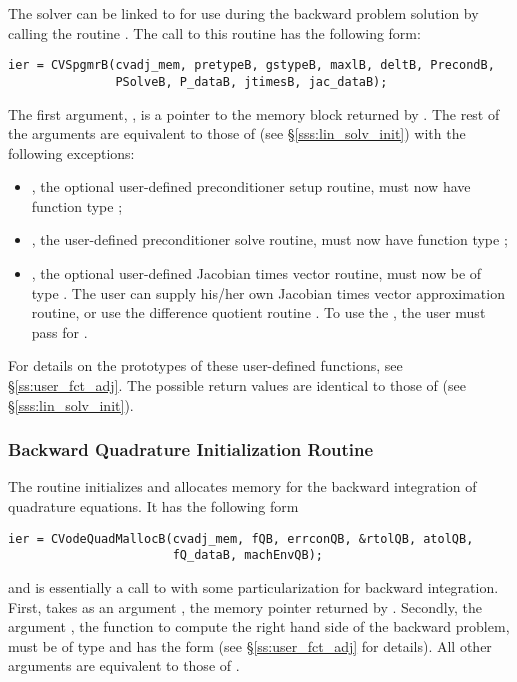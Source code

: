 \begin{itemize}
  The {\cvspgmr} solver can be linked to {\cvodes} for use during the
  backward problem solution by calling the routine . The
  call to this routine has the following form:
\begin{verbatim}
ier = CVSpgmrB(cvadj_mem, pretypeB, gstypeB, maxlB, deltB, PrecondB, 
               PSolveB, P_dataB, jtimesB, jac_dataB);
\end{verbatim}
  The first argument, , is a pointer to the memory block
  returned by . The rest of the arguments are equivalent 
  to those of  (see \S\ref{sss:lin_solv_init}) with the 
  following exceptions:
  \begin{itemize}
  \item {}, the optional user-defined preconditioner setup
    routine, must now have function type ;
  \item {}, the user-defined preconditioner solve routine,
    must now have function type ;
  \item {}, the optional user-defined Jacobian times vector 
    routine, must now be of type . The user can 
    supply his/her own Jacobian times vector approximation routine, 
    or use the difference quotient routine .
    To use the , the user must pass  
    for .
  \end{itemize}
  For details on the prototypes of these user-defined functions, 
  see \S\ref{ss:user_fct_adj}.
  The possible return values  are identical to those of 
  (see \S\ref{sss:lin_solv_init}).


\end{itemize}

\subsubsection{Backward Quadrature Initialization Routine}\label{sss:cvodequadmallocb}

The routine  initializes and allocates memory for the backward
integration of quadrature equations. It has the following form
\begin{verbatim}
ier = CVodeQuadMallocB(cvadj_mem, fQB, errconQB, &rtolQB, atolQB, 
                       fQ_dataB, machEnvQB);
\end{verbatim}
and is essentially a call to  with some particularization for 
backward integration. First,  takes as an argument 
, the memory pointer returned by .
Secondly, the argument , the {\C} function to compute the right hand side 
of the backward problem, must be of type  and
has the form  
(see \S\ref{ss:user_fct_adj} for details). 
All other arguments are equivalent to those of . 

